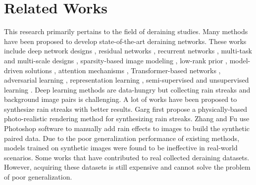 \section{Related Works}
\label{sec:related}
%
This research primarily pertains to the field of deraining studies.
%
Many methods have been proposed to develop state-of-the-art deraining networks.
%
These works include deep network designs \cite{fu2017clearing,wang2019erl}, residual networks \cite{fu2017removing,liu2019dual}, recurrent networks \cite{ren2019progressive,yang2019single,yang2019scale}, multi-task \cite{wang2019dtdn,du2020conditional} and multi-scale designs \cite{jiang2020multi,fu2019lightweight,yasarla2019uncertainty,yu2019gradual,wei2019coarse,wang2020dcsfn,zamir2021multi}, sparsity-based image modeling \cite{gu2017joint,zhu2017joint}, low-rank prior \cite{chang2017transformed}, model-driven solutions \cite{wang2020model,wang2020rethinking}, attention mechanisms \cite{wang2020joint,chen2021pre,fu2021rain}, Transformer-based networks \cite{chen2023learning,chen2022cross}, adversarial learning \cite{li2019heavy}, representation learning \cite{chen2021robust}, semi-supervised \cite{yasarla2020syn2real} and unsupervised learning \cite{chen2022unpaired}.
%
Deep learning methods are data-hungry but collecting rain streaks and background image pairs is challenging.
%
A lot of works have been proposed to synthesize rain streaks with better results.
%
Garg \etal \cite{garg2006photorealistic} first propose a physically-based photo-realistic rendering method for synthesizing rain streaks.
%
Zhang \etal \cite{zhang2018density} and Fu \etal \cite{fu2017clearing} use Photoshop software to manually add rain effects to images to build the synthetic paired data.
%
Due to the poor generalization performance of existing methods, models trained on synthetic images were found to be ineffective in real-world scenarios.
%
Some works \cite{yang2017deep,zhang2019image,wang2019spatial} that have contributed to real collected deraining datasets.
%
However, acquiring these datasets is still expensive and cannot solve the problem of poor generalization.

